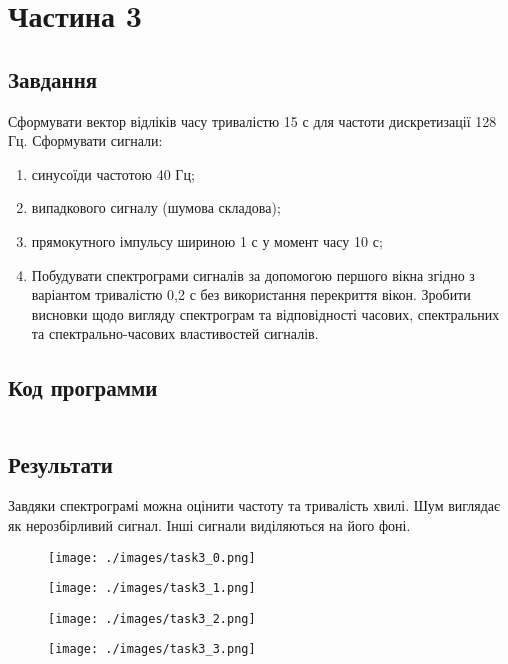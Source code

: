 \section{Частина 3}
\label{sec:task3}

\subsection{Завдання}
\label{subsec:task3_task}

Сформувати вектор відліків часу тривалістю 15 с для частоти
дискретизації 128 Гц. Сформувати сигнали:
\begin{enumerate}
    \item синусоїди частотою 40 Гц;
    \item випадкового сигналу (шумова складова);
    \item прямокутного імпульсу шириною 1 с у момент часу 10 с;
    \item Побудувати спектрограми сигналів за допомогою першого вікна згідно з
          варіантом тривалістю 0,2 с без використання перекриття вікон.
          Зробити висновки щодо вигляду спектрограм та відповідності часових,
          спектральних та спектрально-часових властивостей сигналів.
\end{enumerate}

\subsection{Код программи}
\label{subsec:task3_code}
\inputminted{python}{../src/task3.py}

\subsection{Результати}
\label{subsec:task3_results}

Завдяки спектрограмі можна оцінити частоту та тривалість хвилі.
Шум виглядає як нерозбірливий сигнал.
Інші сигнали виділяються на його фоні.

\begin{figure}[!ht]
    \centering
    \texttt{[image: ./images/task3\_0.png]}
\end{figure}

\begin{figure}[!ht]
    \centering
    \texttt{[image: ./images/task3\_1.png]}
\end{figure}

\begin{figure}[!ht]
    \centering
    \texttt{[image: ./images/task3\_2.png]}
\end{figure}

\begin{figure}[!ht]
    \centering
    \texttt{[image: ./images/task3\_3.png]}
\end{figure}
